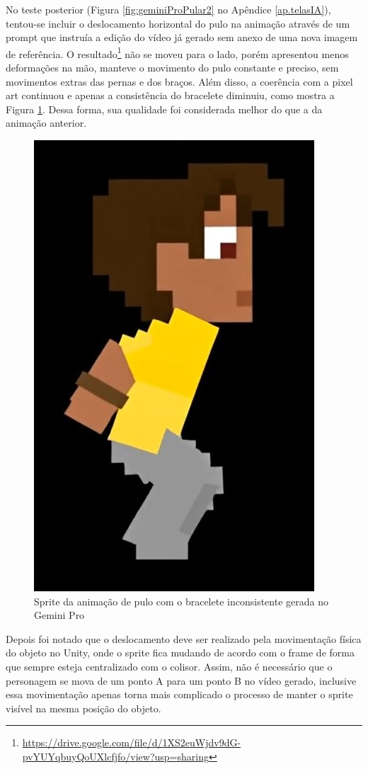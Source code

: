 \begin{figure}[htbp]
\begin{minipage}{0.45\textwidth}
    \end{minipage}
\end{figure}


No teste posterior (Figura \ref{fig:geminiProPular2} no Apêndice \ref{ap.telasIA}), tentou-se incluir o deslocamento horizontal do pulo na animação através de um prompt que instruía a edição do vídeo já gerado sem anexo de uma nova imagem de referência. O resultado\footnote{\url{https://drive.google.com/file/d/1XS2euWjdv9dG-pvYUYqbuyQoUXlcfjfo/view?usp=sharing}} não se moveu para o lado, porém apresentou menos deformações na mão, manteve o movimento do pulo constante e preciso, sem movimentos extras das pernas e dos braços. Além disso, a coerência com a pixel art continuou e apenas a consistência do bracelete diminuiu, como mostra a Figura \ref{fig:geminiProPularMaoMelhor}. Dessa forma, sua qualidade foi considerada melhor do que a da animação anterior.

\begin{figure}[htbp]
    \centering
    \caption{\small Sprite da animação de pulo com o bracelete inconsistente gerada no Gemini Pro}
    \label{fig:geminiProPularMaoMelhor}
    \includegraphics[width=0.3\linewidth]{figs/geminiPro/chat7/maoCerta.jpg}
\end{figure}


Depois foi notado que o deslocamento deve ser realizado pela movimentação física do objeto no Unity, onde o sprite fica mudando de acordo com o frame de forma que sempre esteja centralizado com o colisor. Assim, não é necessário que o personagem se mova de um ponto A para um ponto B no vídeo gerado, inclusive essa movimentação apenas torna mais complicado o processo de manter o sprite visível na mesma posição do objeto.

